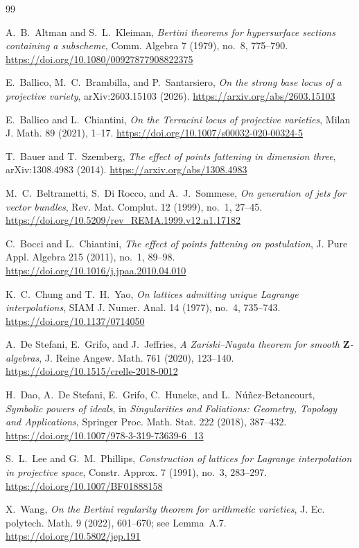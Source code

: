 \documentclass[11pt]{article}
\begin{document}
\small
\begin{thebibliography}{99}

A.~B.~Altman and S.~L.~Kleiman,
\emph{Bertini theorems for hypersurface sections containing a subscheme},
Comm. Algebra 7 (1979), no.~8, 775--790.
\url{https://doi.org/10.1080/00927877908822375}

E.~Ballico, M.~C.~Brambilla, and P.~Santarsiero,
\emph{On the strong base locus of a projective variety},
arXiv:2603.15103 (2026).
\url{https://arxiv.org/abs/2603.15103}

E.~Ballico and L.~Chiantini,
\emph{On the Terracini locus of projective varieties},
Milan J. Math. 89 (2021), 1--17.
\url{https://doi.org/10.1007/s00032-020-00324-5}

T.~Bauer and T.~Szemberg,
\emph{The effect of points fattening in dimension three},
arXiv:1308.4983 (2014).
\url{https://arxiv.org/abs/1308.4983}

M.~C.~Beltrametti, S.~Di Rocco, and A.~J.~Sommese,
\emph{On generation of jets for vector bundles},
Rev. Mat. Complut. 12 (1999), no.~1, 27--45.
\url{https://doi.org/10.5209/rev_REMA.1999.v12.n1.17182}

C.~Bocci and L.~Chiantini,
\emph{The effect of points fattening on postulation},
J. Pure Appl. Algebra 215 (2011), no.~1, 89--98.
\url{https://doi.org/10.1016/j.jpaa.2010.04.010}

K.~C.~Chung and T.~H.~Yao,
\emph{On lattices admitting unique Lagrange interpolations},
SIAM J. Numer. Anal. 14 (1977), no.~4, 735--743.
\url{https://doi.org/10.1137/0714050}

A.~De Stefani, E.~Grifo, and J.~Jeffries,
\emph{A Zariski--Nagata theorem for smooth $\mathbf Z$-algebras},
J. Reine Angew. Math. 761 (2020), 123--140.
\url{https://doi.org/10.1515/crelle-2018-0012}

H.~Dao, A.~De Stefani, E.~Grifo, C.~Huneke, and L.~N\'u\~nez-Betancourt,
\emph{Symbolic powers of ideals}, in \emph{Singularities and Foliations:
Geometry, Topology and Applications}, Springer Proc. Math. Stat. 222 (2018),
387--432.
\url{https://doi.org/10.1007/978-3-319-73639-6_13}

S.~L.~Lee and G.~M.~Phillips,
\emph{Construction of lattices for Lagrange interpolation in projective space},
Constr. Approx. 7 (1991), no.~3, 283--297.
\url{https://doi.org/10.1007/BF01888158}

X.~Wang,
\emph{On the Bertini regularity theorem for arithmetic varieties},
J. Ec. polytech. Math. 9 (2022), 601--670; see Lemma~A.7.
\url{https://doi.org/10.5802/jep.191}

\end{thebibliography}
\end{document}

